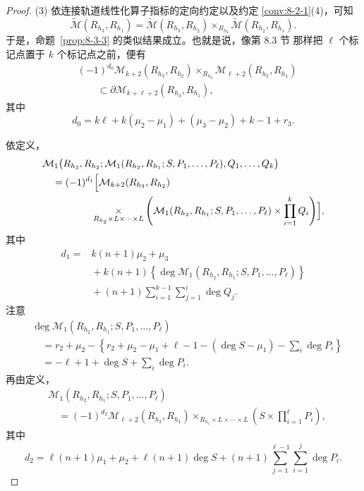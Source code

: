 \begin{proof}
\textup{(3)}
依连接轨道线性化算子指标的定向约定以及约定
\ref{conv:8-2-1}(4)，可知
\[
 \widetilde{\mathcal M}(R_{h_3},R_{h_1})
 =
 \widetilde{\mathcal M}(R_{h_3},R_{h_2})
 \mathop{\times}_{R_{h_2}}
 \widetilde{\mathcal M}(R_{h_2},R_{h_1}).
\]
于是，命题~\ref{prop:8-3-3} 的类似结果成立。也就是说，像第 8.3 节
那样把 $\ell$ 个标记点置于 $k$ 个标记点之前，便有
\[
\begin{aligned}
 &(-1)^{d_0}
 \mathcal M_{k+2}(R_{h_3},R_{h_2})
 \mathop{\times}_{R_{h_2}}
 \mathcal M_{\ell+2}(R_{h_2},R_{h_1})\\
 &\qquad\subset
 \partial\mathcal M_{k+\ell+2}(R_{h_3},R_{h_1}),
\end{aligned}
\]
其中
\[
 d_0=k\ell+k(\mu_2-\mu_1)+(\mu_3-\mu_2)+k-1+r_3.
\]

依定义，
\[
\begin{aligned}
 &\mathcal M_1\bigl(
 R_{h_3},R_{h_2};
 \mathcal M_1(R_{h_2},R_{h_1};S,P_1,\ldots,P_\ell),
 Q_1,\ldots,Q_k
 \bigr)\\
 &\quad=
 (-1)^{d_1}
 \Bigl[
 \mathcal M_{k+2}(R_{h_3},R_{h_2})\\
 &\hspace{5em}{}
 \mathop{\times}_{R_{h_2}\times L\times\cdots\times L}
 \left(
 \mathcal M_1(R_{h_2},R_{h_1};S,P_1,\ldots,P_\ell)
 \times\prod_{i=1}^{k}Q_i
 \right)
 \Bigr],
\end{aligned}
\]
其中
\[
\begin{aligned}
 d_1={}&
 k(n+1)\mu_2+\mu_3\\
 &{}+k(n+1)
 \left\{
 \deg\mathcal M_1
 (R_{h_2},R_{h_1};S,P_1,\ldots,P_\ell)
 \right\}\\
 &{}+(n+1)
 \sum_{i=1}^{k-1}\sum_{j=1}^{i}\deg Q_j.
\end{aligned}
\]
注意
\[
\begin{aligned}
 &\deg\mathcal M_1
 (R_{h_2},R_{h_1};S,P_1,\ldots,P_\ell)\\
 &\quad=
 r_2+\mu_2-
 \left\{
 r_2+\mu_2-\mu_1+\ell-1
 -(\deg S-\mu_1)-\sum_i\deg P_i
 \right\}\\
 &\quad=
 -\ell+1+\deg S+\sum_i\deg P_i.
\end{aligned}
\]
再由定义，
\[
\begin{aligned}
 &\mathcal M_1(R_{h_2},R_{h_1};S,P_1,\ldots,P_\ell)\\
 &\quad=
 (-1)^{d_2}
 \mathcal M_{\ell+2}(R_{h_2},R_{h_1})
 \mathop{\times}_{R_{h_1}\times L\times\cdots\times L}
 \left(S\times\prod_{i=1}^{\ell}P_i\right),
\end{aligned}
\]
其中
\[
 d_2=
 \ell(n+1)\mu_1+\mu_2+\ell(n+1)\deg S
 +(n+1)\sum_{j=1}^{\ell-1}\sum_{i=1}^{j}\deg P_i.
\]


\end{proof}
